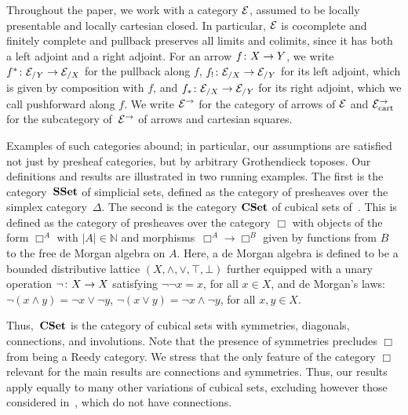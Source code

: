 \documentclass[reqno,10pt,a4paper,oneside,draft]{amsart}
\begin{document}
Throughout the paper, we work with a category $\cal{E}$, assumed to be locally presentable and locally cartesian closed.
In particular, $\catE$ is cocomplete and finitely complete and pullback preserves all limits and colimits, since it has both a left adjoint and a right adjoint.
For an arrow $f \co X \to Y$, we write $f^* \co \cal{E}_{/Y} \to \cal{E}_{/X}$ for the pullback along $f$, $f_{!} \co \cal{E}_{/X} \to \cal{E}_{/Y}$ for its left adjoint, which is given by composition with $f$, and $f_* \co \cal{E}_{/X} \to \cal{E}_{/Y}$ for its right adjoint, which we call pushforward along $f$.
We write $\cal{E}^\to$ for the category of arrows of $\cal{E}$ and $\cal{E}^\to_{\mathrm{cart}}$ for the subcategory of~$\cal{E}^\to$ of arrows and cartesian squares.

Examples of such categories abound; in particular, our assumptions are satisfied not just by presheaf categories, but by arbitrary Grothendieck toposes.
Our definitions and results are illustrated in two running examples.
The first is the category~$\SSet$ of simplicial sets, defined as the category of presheaves over the simplex category~$\Delta$.
The second is the category $\CSet$ of cubical sets of~\cite{cohen-et-al:cubicaltt}.
This is defined as the category of presheaves over the category $\Box$ with objects of the form $\Box^A$ with $|A| \in \mathbb{N}$ and morphisms~$\Box^A \to \Box^B$ given by functions from $B$ to the free de Morgan algebra on
$A$. Here, a de Morgan algebra is defined to be a bounded distributive lattice $(X, \land, \lor, \top, \bot)$ further equipped with a unary operation $\neg \co X \to X$ satisfying $\neg \neg x = x$, for all $x \in X$, and de Morgan's laws: $\neg (x \land y) = \neg x \lor \neg y$, $\neg (x \lor y) = \neg x \land \neg y$, for all $x, y \in X$.


Thus,~$\CSet$ is the category of cubical sets with symmetries, diagonals, connections, and involutions.
Note that the presence of symmetries precludes $\Box$ from being a Reedy category.
We stress that the only feature of the category $\Box$ relevant for the main results are connections and symmetries.
Thus, our results apply equally to many other variations of cubical sets, excluding however those considered in~\cite{coquand-cubical-sets,huber-thesis}, which do not have connections.
\end{document}
